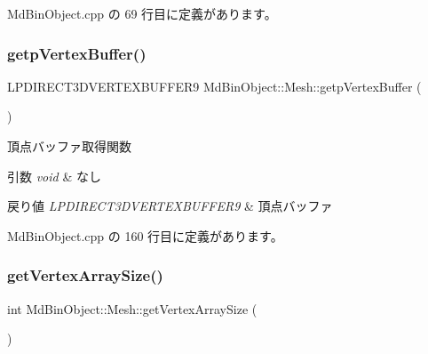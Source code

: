  Md\+Bin\+Object.\+cpp の 69 行目に定義があります。

\mbox{\label{class_md_bin_object_1_1_mesh_a62ca792b3cbc96fa052555dfca83eb3d}} 
\subsubsection{\texorpdfstring{getp\+Vertex\+Buffer()}{getpVertexBuffer()}}
{\footnotesize\ttfamily L\+P\+D\+I\+R\+E\+C\+T3\+D\+V\+E\+R\+T\+E\+X\+B\+U\+F\+F\+E\+R9 Md\+Bin\+Object\+::\+Mesh\+::getp\+Vertex\+Buffer (\begin{DoxyParamCaption}{ }\end{DoxyParamCaption})}



頂点バッファ取得関数 


\begin{DoxyParams}{引数}
{\em void} & なし \\
\hline
\end{DoxyParams}

\begin{DoxyRetVals}{戻り値}
{\em L\+P\+D\+I\+R\+E\+C\+T3\+D\+V\+E\+R\+T\+E\+X\+B\+U\+F\+F\+E\+R9} & 頂点バッファ \\
\hline
\end{DoxyRetVals}


 Md\+Bin\+Object.\+cpp の 160 行目に定義があります。

\mbox{\label{class_md_bin_object_1_1_mesh_a60cd3c85b9f5660ae82a74902a5d5af5}} 
\subsubsection{\texorpdfstring{get\+Vertex\+Array\+Size()}{getVertexArraySize()}}
{\footnotesize\ttfamily int Md\+Bin\+Object\+::\+Mesh\+::get\+Vertex\+Array\+Size (\begin{DoxyParamCaption}{ }\end{DoxyParamCaption})}



